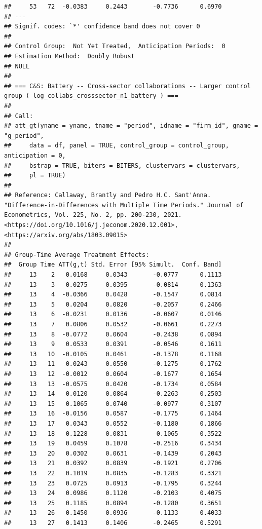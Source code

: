 \documentclass[
]{article}
\begin{document}
\begin{verbatim}
##     53   72  -0.0383     0.2443       -0.7736      0.6970  
## ---
## Signif. codes: `*' confidence band does not cover 0
## 
## Control Group:  Not Yet Treated,  Anticipation Periods:  0
## Estimation Method:  Doubly Robust
## NULL
## 
## === C&S: Battery -- Cross-sector collaborations -- Larger control group ( log_collabs_crosssector_n1_battery ) ===
## 
## Call:
## att_gt(yname = yname, tname = "period", idname = "firm_id", gname = "g_period", 
##     data = df, panel = TRUE, control_group = control_group, anticipation = 0, 
##     bstrap = TRUE, biters = BITERS, clustervars = clustervars, 
##     pl = TRUE)
## 
## Reference: Callaway, Brantly and Pedro H.C. Sant'Anna.  "Difference-in-Differences with Multiple Time Periods." Journal of Econometrics, Vol. 225, No. 2, pp. 200-230, 2021. <https://doi.org/10.1016/j.jeconom.2020.12.001>, <https://arxiv.org/abs/1803.09015> 
## 
## Group-Time Average Treatment Effects:
##  Group Time ATT(g,t) Std. Error [95% Simult.  Conf. Band]  
##     13    2   0.0168     0.0343       -0.0777      0.1113  
##     13    3   0.0275     0.0395       -0.0814      0.1363  
##     13    4  -0.0366     0.0428       -0.1547      0.0814  
##     13    5   0.0204     0.0820       -0.2057      0.2466  
##     13    6  -0.0231     0.0136       -0.0607      0.0146  
##     13    7   0.0806     0.0532       -0.0661      0.2273  
##     13    8  -0.0772     0.0604       -0.2438      0.0894  
##     13    9   0.0533     0.0391       -0.0546      0.1611  
##     13   10  -0.0105     0.0461       -0.1378      0.1168  
##     13   11   0.0243     0.0550       -0.1275      0.1762  
##     13   12  -0.0012     0.0604       -0.1677      0.1654  
##     13   13  -0.0575     0.0420       -0.1734      0.0584  
##     13   14   0.0120     0.0864       -0.2263      0.2503  
##     13   15   0.1065     0.0740       -0.0977      0.3107  
##     13   16  -0.0156     0.0587       -0.1775      0.1464  
##     13   17   0.0343     0.0552       -0.1180      0.1866  
##     13   18   0.1228     0.0831       -0.1065      0.3522  
##     13   19   0.0459     0.1078       -0.2516      0.3434  
##     13   20   0.0302     0.0631       -0.1439      0.2043  
##     13   21   0.0392     0.0839       -0.1921      0.2706  
##     13   22   0.1019     0.0835       -0.1283      0.3321  
##     13   23   0.0725     0.0913       -0.1795      0.3244  
##     13   24   0.0986     0.1120       -0.2103      0.4075  
##     13   25   0.1185     0.0894       -0.1280      0.3651  
##     13   26   0.1450     0.0936       -0.1133      0.4033  
##     13   27   0.1413     0.1406       -0.2465      0.5291  

\end{verbatim}
\end{document}
